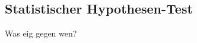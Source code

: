\documentclass[
10pt, %
a4paper, %
oneside, %
headinclude,footinclude, %
BCOR5mm, %
]{scrartcl}
\begin{document}
\subsection{Statistischer Hypothesen-Test}
Was eig gegen wen?



\renewcommand{\refname}{\spacedlowsmallcaps{Literatur/Quellen}} %




\end{document}
